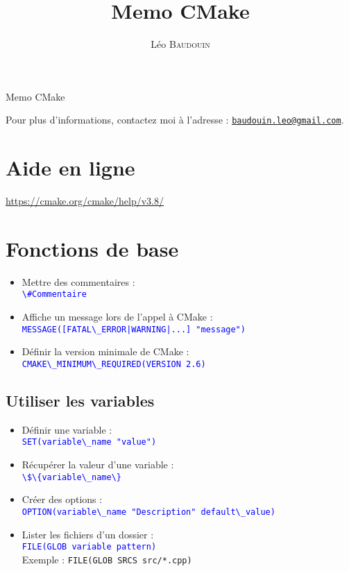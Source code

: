 \documentclass[a4paper,oneside]{article}
\title{\huge Memo CMake}
\author{L\'eo \textsc{Baudouin}}
\date{}
\begin{document}
{\Huge Memo CMake}
\newline

\noindent Pour plus d'informations, contactez moi à l'adresse : 
\href{mailto:baudouin.leo@gmail.com}{\nolinkurl{baudouin.leo@gmail.com}}.

\section{Aide en ligne}

\url{https://cmake.org/cmake/help/v3.8/}


\section{Fonctions de base}
\begin{itemize}
\item Mettre des commentaires :\\
  \textcolor{blue}{\verb?\#Commentaire ?}
\item Affiche un message lors de l'appel à CMake :\\
  \textcolor{blue}{\verb?MESSAGE([FATAL\_ERROR|WARNING|...] "message") ?}
\item Définir la version minimale de CMake :\\
  \textcolor{blue}{\verb?CMAKE\_MINIMUM\_REQUIRED(VERSION 2.6)?}
\end{itemize}

\subsection{Utiliser les variables}
\begin{itemize}
\item Définir une variable :\\
  \textcolor{blue}{\verb?SET(variable\_name "value")?}
\item Récupérer la valeur d'une variable :\\
  \textcolor{blue}{\verb?\$\{variable\_name\}?}
\item Créer des options :\\
  \textcolor{blue}{\verb?OPTION(variable\_name "Description" default\_value)?}
\item Lister les fichiers d'un dossier :\\
  \textcolor{blue}{\verb?FILE(GLOB variable pattern)?}\\
  Exemple : \verb?FILE(GLOB SRCS src/*.cpp)?
\end{itemize}
\end{document}
